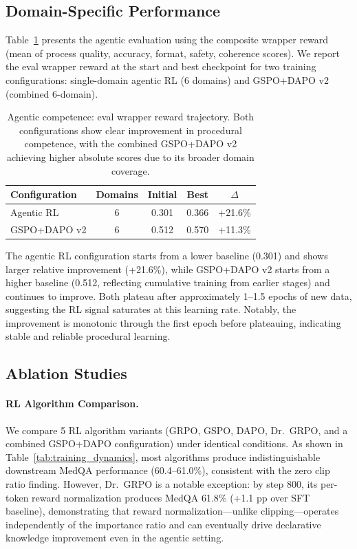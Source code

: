\documentclass{article}
\begin{document}
\subsection{Domain-Specific Performance}
\label{sec:domain_results}

Table~\ref{tab:domain_results} presents the agentic evaluation using the composite wrapper reward (mean of process quality, accuracy, format, safety, coherence scores). We report the eval wrapper reward at the start and best checkpoint for two training configurations: single-domain agentic RL (6 domains) and GSPO+DAPO v2 (combined 6-domain).

\begin{table}[t]
\centering
\caption{Agentic competence: eval wrapper reward trajectory. Both configurations show clear improvement in procedural competence, with the combined GSPO+DAPO v2 achieving higher absolute scores due to its broader domain coverage.}
\label{tab:domain_results}
\begin{tabular}{lcccc}
\toprule
\textbf{Configuration} & \textbf{Domains} & \textbf{Initial} & \textbf{Best} & \textbf{$\Delta$} \\
\midrule
Agentic RL & 6 & 0.301 & 0.366 & +21.6\% \\
GSPO+DAPO v2 & 6 & 0.512 & 0.570 & +11.3\% \\
\bottomrule
\end{tabular}
\end{table}

The agentic RL configuration starts from a lower baseline (0.301) and shows larger relative improvement (+21.6\%), while GSPO+DAPO v2 starts from a higher baseline (0.512, reflecting cumulative training from earlier stages) and continues to improve. Both plateau after approximately 1--1.5 epochs of new data, suggesting the RL signal saturates at this learning rate. Notably, the improvement is monotonic through the first epoch before plateauing, indicating stable and reliable procedural learning.


\subsection{Ablation Studies}
\label{sec:ablation}

\paragraph{RL Algorithm Comparison.}
We compare 5 RL algorithm variants (GRPO, GSPO, DAPO, Dr.~GRPO, and a combined GSPO+DAPO configuration) under identical conditions. As shown in Table~\ref{tab:training_dynamics}, most algorithms produce indistinguishable downstream MedQA performance (60.4--61.0\%), consistent with the zero clip ratio finding. However, Dr.~GRPO is a notable exception: by step 800, its per-token reward normalization produces MedQA 61.8\% (+1.1 pp over SFT baseline), demonstrating that reward normalization---unlike clipping---operates independently of the importance ratio and can eventually drive declarative knowledge improvement even in the agentic setting.
\end{document}
